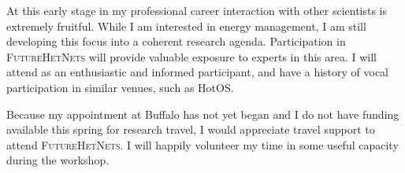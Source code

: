 
At this early stage in my professional career interaction with other
scientists is extremely fruitful. While I am interested in energy management,
I am still developing this focus into a coherent research agenda.
Participation in {\scshape FutureHetNets} will provide valuable exposure to
experts in this area. I will attend as an enthusiastic and informed
participant, and have a history of vocal participation in similar venues,
such as HotOS.


Because my appointment at Buffalo has not yet began and I do not have funding
available this spring for research travel, I would appreciate travel support
to attend {\scshape FutureHetNets}. I will happily volunteer my time in some
useful capacity during the workshop.
